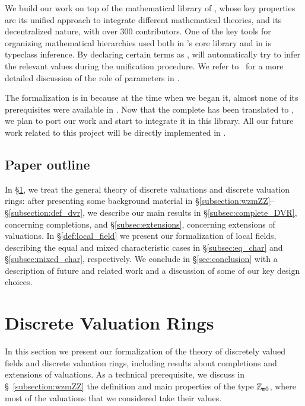 \documentclass[sigplan,10pt, nonacm, review]{acmart}
\begin{document}
We build our work on top of the mathematical library \mathlib of \lean{\empty}, whose key properties are its unified approach to integrate different mathematical theories, and its decentralized nature, with over 300 contributors. One of the key tools for organizing mathematical hierarchies used both in \lean[\empty]'s core library and in \mathlib is typeclass inference. By declaring certain terms as , \lean[\empty] will automatically try to infer the relevant values during the unification procedure. We refer to~\cite{Baa22} for a more detailed discussion of the role of  parameters in \lean[\empty].

The formalization is in \lean because at the time when we began it, almost none of its prerequisites were available in \lean[4]. Now that the complete \mathlib has been translated to \lean[4], we plan to port our work and start to integrate it in this library. All our future work related to this project will be directly implemented in \lean[4].

\subsection{Paper outline}
In \S\ref{section:dvr}, we treat the general theory of discrete valuations and discrete valuation rings: after presenting some background material in \S\ref{subsection:wzmZZ}--\S\ref{subsection:def_dvr}, we describe our main results in \S\ref{subsec:complete_DVR}, concerning completions, and \S\ref{subsec:extensions}, concerning extensions of valuations. In \S\ref{def:local_field} we present our formalization of local fields, describing the equal and mixed characteristic cases in \S\ref{subsec:eq_char} and \S\ref{subsec:mixed_char}, respectively. We conclude in \S\ref{sec:conclusion} with a description of future and related work and a discussion of some of our key design choices.

\section {Discrete Valuation Rings}\label{section:dvr}

In this section we present our formalization of the theory of discretely valued fields and discrete valuation rings, including results about completions and extensions of valuations. As a technical prerequisite, we discuss in \S~\ref{subsection:wzmZZ} the definition and main properties of the \mathlib type $\mathbb{Z}_{\mathtt{m}0}$, where most of the valuations that we considered take their values.
\end{document}
